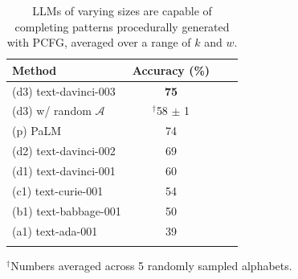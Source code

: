 \begin{table}
    \vspace{-1.1em}
    \small
    \setlength\tabcolsep{3.5pt}
    \centering
    \begin{tabular}{@{}lccc@{}}
    \toprule
    Method & Accuracy (\%) \\
    \midrule
    (d3) text-davinci-003 & \textbf{75} \\
    (d3) w/ random $\mathcal{A}$ &  $^\dagger$58 $\pm$ 1 \\
    (p) PaLM \cite{chowdhery2022palm,anil2023palm} & 74 \\
    (d2) text-davinci-002 \cite{ouyang2022training} & 69 \\
    (d1) text-davinci-001 \cite{brown2020language} & 60 \\
    (c1) text-curie-001 &  54 \\
    (b1) text-babbage-001 & 50 \\
    (a1) text-ada-001 & 39 \\
    \bottomrule
    \vspace{-0.7em}
    \end{tabular}
    \scriptsize
    $^\dagger$Numbers averaged across 5 randomly sampled alphabets.
    \vspace{-2.0em}
    \caption{
    \small
    LLMs of varying sizes are capable of completing patterns procedurally generated with PCFG, averaged over a range of $k$ and $w$.
    \vspace{-2em} 
    }
    \label{tab:pcfg-results}
    \vspace{1em}
\end{table}

